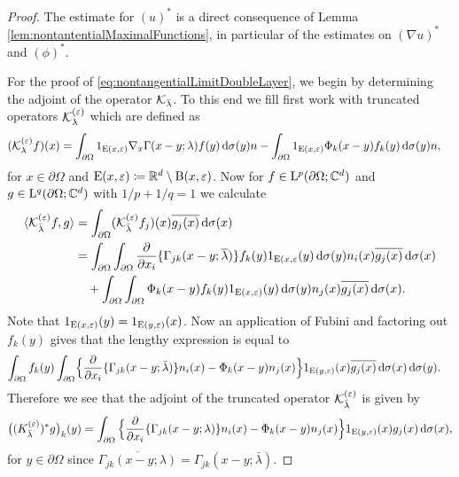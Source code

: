 \begin{proof}
  The estimate for $(u)^*$ is a direct consequence of Lemma \ref{lem:nontantentialMaximalFunctions}, in particular of the estimates on $(\nabla u)^*$ and $(\phi)^*$.

  For the proof of \eqref{eq:nontangentialLimitDoubleLayer}, we begin by determining the adjoint of the operator $\mathcal{K}_{\bar\lambda}$.
  To this end we fill first work with truncated operators $\mathcal{K}_{\lambda}^{(\varepsilon)}$ which are defined as
  \begin{align*}
    (\mathcal{K}_\lambda^{(\varepsilon)} f) (x)
    &= \int_{\partial\Omega} 1_{\mathrm{E}(x,\varepsilon)} \nabla_x \Gamma(x - y; \lambda)  f(y) \, {\operatorname{d}\!{\sigma}}(y) n - \int_{\partial\Omega} 1_{\mathrm{E}(x,\varepsilon)} \Phi_k(x - y) f_k(y) \, {\operatorname{d}\!{\sigma}}(y) n,
  \end{align*}
  for $x \in \partial\Omega$ and $\mathrm{E}(x,\varepsilon) \coloneqq \mathbb{R}^d \setminus \mathrm{B}(x,\varepsilon)$.
  Now for $f \in \mathrm{L}^p(\partial\Omega; \mathbb{C}^d)$ and $g \in \mathrm{L}^q(\partial\Omega; \mathbb{C}^d)$ with $1/p + 1/q = 1$ we calculate
  \begin{align*}
    \langle \mathcal{K}_{\bar\lambda}^{(\varepsilon)}f, g \rangle
    &= \int_{\partial\Omega} (\mathcal{K}_{\bar\lambda}^{(\varepsilon)} f_j)(x) \overline{g_j(x)} \, {\operatorname{d}\!{\sigma}}(x) \\
    &= \int_{\partial\Omega} \int_{\partial\Omega} \frac{\partial}{\partial x_i} \{ \Gamma_{jk} (x - y; \overline\lambda) \} f_k(y) 1_{\mathrm{E}(x,\varepsilon}(y) \, {\operatorname{d}\!{\sigma}}(y) n_i(x) \overline{g_j(x)} \, {\operatorname{d}\!{\sigma}}(x) \\
    &\quad+ \int_{\partial\Omega} \int_{\partial\Omega} \Phi_k(x -y)f_k(y) 1_{\mathrm{E}(x,\varepsilon)}(y) \, {\operatorname{d}\!{\sigma}}(y) n_j(x) \overline{g_j(x)} \, {\operatorname{d}\!{\sigma}}(x).
  \end{align*}
  Note that $1_{\mathrm{E}(x,\varepsilon)}(y) = 1_{\mathrm{E}(y,\varepsilon)}(x)$.
  Now an application of Fubini and factoring out $f_k(y)$ gives that the lengthy expression is equal to
  \begin{align*}
    \int_{\partial\Omega} f_k(y) \int_{\partial\Omega} &\Big\{ \frac{\partial}{\partial x_i} \{ \Gamma_{jk}(x - y; \bar\lambda)\} n_i(x)
    - \Phi_k(x - y)  n_j(x) \Big\}1_{\mathrm{E}(y, \varepsilon)}(x) \overline{g_j(x)} \, {\operatorname{d}\!{\sigma}}(x) \, {\operatorname{d}\!{\sigma}}(y).
  \end{align*}
  Therefore we see that the adjoint of the truncated operator $\mathcal{K}_{\bar\lambda}^{(\varepsilon)}$ is given by
  \begin{align*}
    \big( ( K_{\bar\lambda}^{(\varepsilon)})^* g\big)_k(y)
    = \int_{\partial\Omega} \Big\{ \frac{\partial}{\partial x_i} \{ \Gamma_{jk}(x - y; \lambda)\} n_i(x) - \Phi_k(x - y) n_j(x) \Big\} 1_{\mathrm{E}(y,\varepsilon)}(x) g_j(x) \, {\operatorname{d}\!{\sigma}}(x), 
  \end{align*}
  for $y \in \partial\Omega$ since $\overline{\Gamma_{jk}(x - y; \lambda)} = \Gamma_{jk}(x - y; \bar\lambda)$.


\end{proof}
